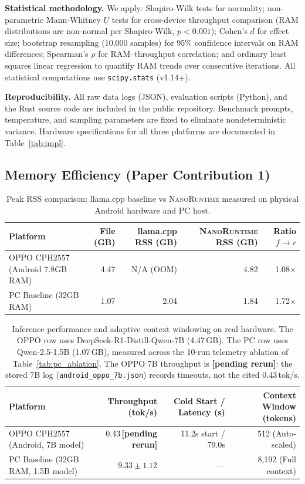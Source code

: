 \documentclass[11pt]{article}
\newcommand{\nanort}{\textsc{NanoRuntime}}
\begin{document}
\textbf{Statistical methodology.} We apply: Shapiro-Wilk tests for normality;
non-parametric Mann-Whitney $U$ tests for cross-device throughput comparison
(RAM distributions are non-normal per Shapiro-Wilk, $p < 0.001$); Cohen's
$d$ for effect size; bootstrap resampling (10,000 samples) for 95\%
confidence intervals on RAM differences; Spearman's $\rho$ for
RAM--throughput correlation; and ordinary least squares linear regression
to quantify RAM trends over consecutive iterations. All statistical
computations use \texttt{scipy.stats} (v1.14+).

\textbf{Reproducibility.} All raw data logs (JSON), evaluation scripts
(Python), and the Rust source code are included in the public repository.
Benchmark prompts, temperature, and sampling parameters are fixed to
eliminate nondeterministic variance. Hardware specifications for all
three platforms are documented in Table~\ref{tab:impl}.

\subsection{Memory Efficiency (Paper Contribution 1)}
\label{sec:mem_results}

\begin{table}[h]
\centering
\caption{Peak RSS comparison: llama.cpp baseline vs \nanort{} measured on physical Android hardware and PC host.}
\label{tab:rss}
\begin{tabular}{lrrrr}
\toprule
Platform & File (GB) & llama.cpp RSS (GB) & \nanort{} RSS (GB) & Ratio $f{\to}r$ \\
\midrule
OPPO CPH2557 (Android 7.8GB RAM) & 4.47 & N/A (OOM) & 4.82 & 1.08$\times$ \\
PC Baseline (32GB RAM) & 1.07 & 2.04 & 1.84 & 1.72$\times$ \\
\bottomrule
\end{tabular}
\end{table}

\begin{table}[h]
\centering
\caption{Inference performance and adaptive context windowing on real hardware. The OPPO row uses DeepSeek-R1-Distill-Qwen-7B (4.47\,GB). The PC row uses Qwen-2.5-1.5B (1.07\,GB), measured across the 10-run telemetry ablation of Table~\ref{tab:pc_ablation}. The OPPO 7B throughput is \textbf{[pending rerun]}: the stored 7B log (\texttt{android\_oppo\_7b.json}) records timeouts, not the cited 0.43\,tok/s.}
\label{tab:tps}
\begin{tabular}{lrrr}
\toprule
Platform & Throughput (tok/s) & Cold Start / Latency (s) & Context Window (tokens) \\
\midrule
OPPO CPH2557 (Android, 7B model) & 0.43\,\textbf{[pending rerun]} & 11.2s start / 79.0s & 512 (Auto-scaled) \\
PC Baseline (32GB RAM, 1.5B model) & $9.33\pm1.12$ & --- & 8,192 (Full context) \\
\bottomrule
\end{tabular}
\end{table}
\end{document}
